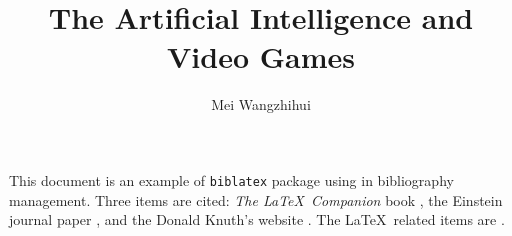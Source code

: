 \documentclass[a4paper,10pt]{article}
\title{The Artificial Intelligence and Video Games}
\author{Mei Wangzhihui}
\begin{document}
\maketitle

This document is an example of \texttt{biblatex} package using in bibliography management. Three items are cited: \textit{The \LaTeX\ Companion} book \cite{latexcompanion}, the Einstein journal paper \cite{einstein}, and the Donald Knuth's website \cite{knuthwebsite}. The \LaTeX\ related items are \cite{latexcompanion,knuthwebsite}. 
 
\medskip

\printbibliography
\end{document}
